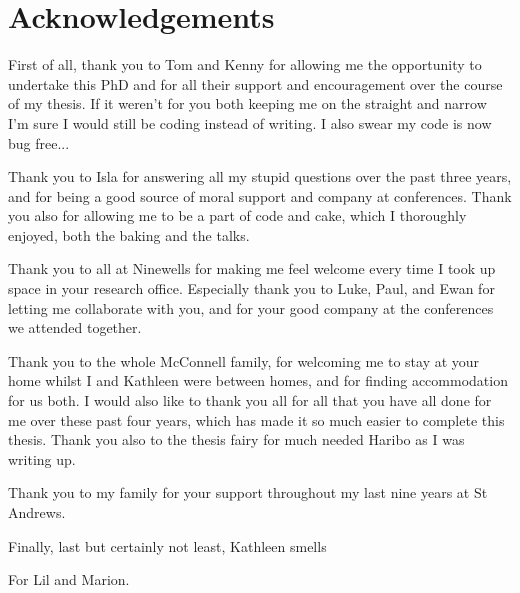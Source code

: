 \documentclass[10pt,a4paper,twoside]{book}
\begin{document}


\chapter{Acknowledgements}
First of all, thank you to Tom and Kenny for allowing me the opportunity to undertake this PhD and for all their support and encouragement over the course of my thesis.
If it weren't for you both keeping me on the straight and narrow I'm sure I would still be coding instead of writing.
I also swear my code is now bug free...
\medskip


Thank you to Isla for answering all my stupid questions over the past three years, and for being a good source of moral support and company at conferences.
Thank you also for allowing me to be a part of code and cake, which I thoroughly enjoyed, both the baking and the talks.
\medskip

Thank you to all at Ninewells for making me feel welcome every time I took up space in your research office.
Especially thank you to Luke, Paul, and Ewan for letting me collaborate with you, and for your good company at the conferences we attended together.
\medskip

Thank you to the whole McConnell family, for welcoming me to stay at your home whilst I and Kathleen were between homes, and for finding accommodation for us both.
I would also like to thank you all for all that you have all done for me over these past four years, which has made it so much easier to complete this thesis.
Thank you also to the thesis fairy for much needed Haribo as I was writing up.
\medskip

Thank you to my family for your support throughout my last nine years at St Andrews.
\medskip

Finally, last but certainly not least, Kathleen smells

\newpage

\clearpage
\begin{center}
    \vspace*{\fill}
    For Lil and Marion.
    \vspace*{\fill}
\end{center}
\clearpage
\end{document}
